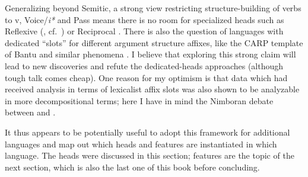 Generalizing beyond Semitic, a strong view restricting structure-building of verbs to v, Voice/\textit{i*} and Pass means there is no room for specialized heads such as Reflexive (\citealt{ahn15phd}, cf.~\citealt{spathas17camvoice,spathas17debrecen}) or Reciprocal \citep{bruening04}. There is also the question of languages with dedicated ``slots'' for different argument structure affixes, like the CARP template of Bantu and similar phenomena \citep{hyman03,paster05}. I believe that exploring this strong claim will lead to new discoveries and refute the dedicated-heads approaches (although tough talk comes cheap). One reason for my optimism is that data which had received analysis in terms of lexicalist affix slots was also shown to be analyzable in more decompositional terms; here I have in mind the Nimboran debate between \cite{inkelas93} and \cite{noyer98}.

It thus appears to be potentially useful to adopt this framework for additional languages and map out which heads and features are instantiated in which language. The heads were discussed in this section; features are the topic of the next section, which is also the last one of this book before concluding.


